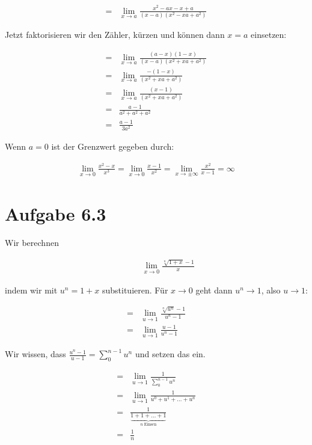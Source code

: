 \documentclass[a4paper,german,12pt,smallheadings]{scrartcl}
\begin{document}
\begin{align*}
  = &\lim_{x \to a} \frac{x^2 - ax - x + a}{(x-a)(x^2 - xa + a^2)}
\end{align*}

Jetzt faktorisieren wir den Zähler, kürzen und können dann $x = a$ einsetzen:

\begin{align*}
  = &\lim_{x \to a} \frac{(a-x)(1-x)}{(x-a)(x^2 + xa + a^2)} \\
  = &\lim_{x \to a} \frac{-(1-x)}{(x^2 + xa + a^2)} \\
  = &\lim_{x \to a} \frac{(x-1)}{(x^2 + xa + a^2)} \\
  = &\frac{a-1}{a^2 + a^2 + a^2} \\
  = &\frac{a-1}{3a^2}
\end{align*}

Wenn $a = 0$ ist der Grenzwert gegeben durch:

\begin{align*}
  \lim_{x \to 0} \frac{x^2 - x}{x^3} = \lim_{x \to 0} \frac{x - 1}{x^2} = \lim_{x \to \pm\infty} \frac{x^2}{x-1} = \infty
\end{align*}


\section*{Aufgabe 6.3}

Wir berechnen

\begin{align*}
  \qquad&\lim_{x \to 0} \frac{\sqrt[n]{1+x} - 1}{x}
\end{align*}

indem wir mit $u^n = 1+x$ substituieren. Für $x \to 0$ geht dann $u^n \to 1$, also $u \to 1$:

\begin{align*}
  = &\lim_{u \to 1} \frac{\sqrt[n]{u^n} - 1}{u^n -1} \\
  = &\lim_{u \to 1} \frac{u - 1}{u^n -1}
\end{align*}

Wir wissen, dass $\frac{u^n-1}{u-1} = \sum_0^{n-1} u^n$ und setzen das ein.

\begin{align*}
  = &\lim_{u \to 1} \frac{1}{\sum_0^{n-1} u^n} \\
  = &\lim_{u \to 1} \frac{1}{u^0 + u^1 + \dots + u^n} \\
  = &\frac{1}{\underbrace{1 + 1 + \dots + 1}_{n\;\text{Einsen}}} \\
  = &\frac{1}{n}
\end{align*}
\end{document}
